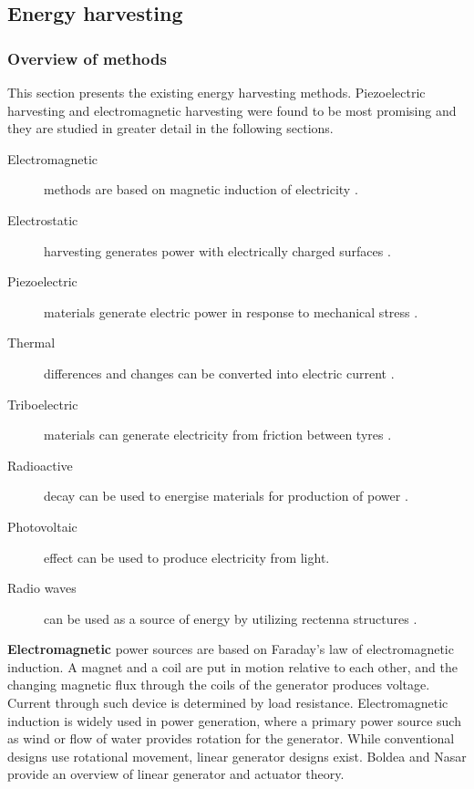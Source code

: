 \subsection{Energy harvesting}\label{sect:background}
\subsubsection{Overview of methods} \label{sect:overview}
This section presents the existing energy harvesting methods. Piezoelectric harvesting and electromagnetic harvesting were found to be most promising and they are studied in greater detail in the following sections.

\begin{description}
  \item[Electromagnetic] methods are based on magnetic induction of electricity \cite{Kubba2014}.
  \item[Electrostatic] harvesting generates power with electrically charged surfaces \cite{Kubba2014}.
  \item[Piezoelectric] materials generate electric power in response to mechanical stress \cite{Kubba2014}.
  \item[Thermal] differences and changes can be converted into electric current \cite{Bowen2014}.
  \item[Triboelectric] materials can generate electricity from friction between tyres \cite{Bowen2014}.
  \item[Radioactive] decay can be used to energise materials for production of power \cite{Lal2004}.
  \item[Photovoltaic] effect can be used to produce electricity from light.
  \item[Radio waves] can be used as a source of energy by utilizing rectenna structures \cite{Patel2014}. 
\end{description}

\textbf{Electromagnetic} power sources are based on Faraday's law of electromagnetic induction. A magnet and a coil are put in motion relative to each other, and the changing magnetic flux through the coils of the generator produces voltage. Current through such device is determined by load resistance. Electromagnetic induction is widely used in power generation, where a primary power source such as wind or flow of water provides rotation for the generator. While conventional designs use rotational movement, linear generator designs exist. Boldea and Nasar \cite{Boldea1999} provide an overview of linear generator and actuator theory. 

